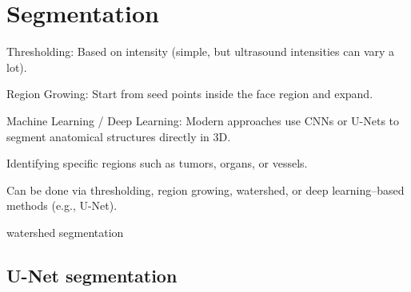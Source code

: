\chapter{Segmentation}


Thresholding: Based on intensity (simple, but ultrasound intensities can vary a lot).

Region Growing: Start from seed points inside the face region and expand.

Machine Learning / Deep Learning: Modern approaches use CNNs or U-Nets to segment anatomical structures directly in 3D.

Identifying specific regions such as tumors, organs, or vessels.

Can be done via thresholding, region growing, watershed, or deep learning–based methods (e.g., U-Net).

watershed segmentation

\section{U-Net segmentation}